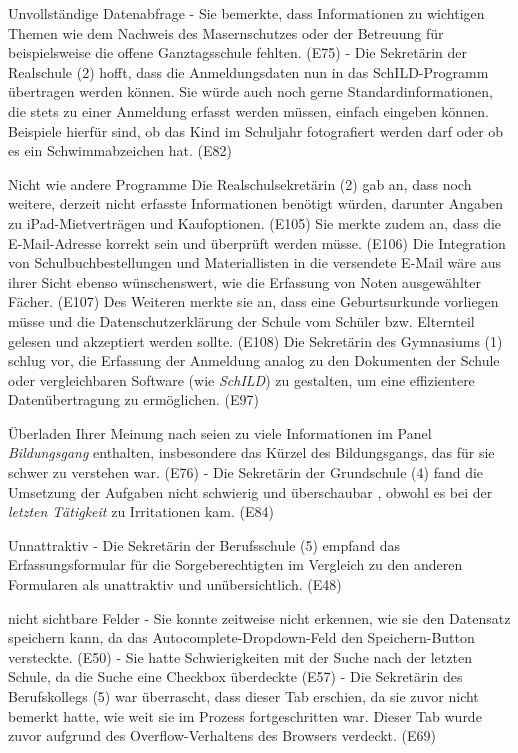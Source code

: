 Unvollständige Datenabfrage
- Sie bemerkte, dass Informationen zu wichtigen Themen wie dem Nachweis des Masernschutzes oder der Betreuung für beispielsweise die offene Ganztagsschule fehlten. (E75)
- Die Sekretärin der Realschule (2) hofft, dass die Anmeldungsdaten nun in das SchILD-Programm übertragen werden können. Sie würde auch noch gerne \glqq Standardinformationen\grqq{}, die stets zu einer Anmeldung erfasst werden müssen, einfach eingeben können. Beispiele hierfür sind, ob das Kind im Schuljahr fotografiert werden darf oder ob es ein Schwimmabzeichen hat. (E82) 

Nicht wie andere Programme
Die Realschulsekretärin (2) gab an, dass noch weitere, derzeit nicht erfasste Informationen benötigt würden, darunter Angaben zu iPad-Mietverträgen und Kaufoptionen. (E105) Sie merkte zudem an, dass die E-Mail-Adresse korrekt sein und überprüft werden müsse. (E106) Die Integration von Schulbuchbestellungen und Materiallisten in die versendete E-Mail wäre aus ihrer Sicht ebenso wünschenswert, wie die Erfassung von Noten ausgewählter Fächer. (E107) Des Weiteren merkte sie an, dass eine Geburtsurkunde vorliegen müsse und die Datenschutzerklärung der Schule vom Schüler bzw. Elternteil gelesen und akzeptiert werden sollte. (E108)
Die Sekretärin des Gymnasiums (1) schlug vor, die Erfassung der Anmeldung analog zu den Dokumenten der Schule oder vergleichbaren Software (wie \textit{SchILD}) zu gestalten, um eine effizientere Datenübertragung zu ermöglichen. (E97) 


Überladen
Ihrer Meinung nach seien zu viele Informationen im Panel \textit{Bildungsgang} enthalten, insbesondere das Kürzel des Bildungsgangs, das für sie schwer zu verstehen war. (E76)
- Die Sekretärin der Grundschule (4) fand die Umsetzung der Aufgaben \glqq nicht schwierig\grqq{}  und \glqq überschaubar\grqq{} , obwohl es bei der \textit{letzten Tätigkeit} zu Irritationen kam. (E84)

Unnattraktiv
- Die Sekretärin der Berufsschule (5) empfand das Erfassungsformular für die Sorgeberechtigten im Vergleich zu den anderen Formularen als \glqq unattraktiv\grqq{} und \glqq unübersichtlich\grqq{}. (E48)

nicht sichtbare Felder
- Sie konnte zeitweise nicht erkennen, wie sie den Datensatz speichern kann, da das Autocomplete-Dropdown-Feld den Speichern-Button versteckte. (E50)
- Sie hatte Schwierigkeiten mit der Suche nach der letzten Schule, da die Suche eine Checkbox überdeckte (E57) 
- Die Sekretärin des Berufskollegs (5) war überrascht, dass dieser Tab erschien, da sie zuvor nicht bemerkt hatte, wie weit sie im Prozess fortgeschritten war. Dieser Tab wurde zuvor aufgrund des Overflow-Verhaltens des Browsers verdeckt. (E69)
 

